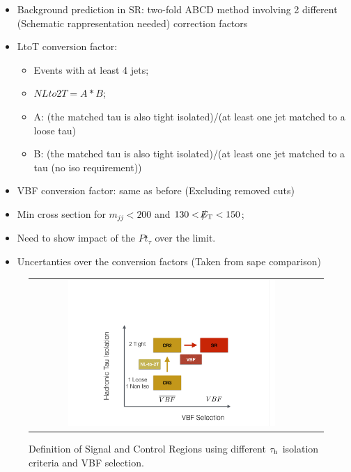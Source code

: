 \begin{itemize}
	
	\item Background prediction in SR: two-fold ABCD method involving 2 different (Schematic rappresentation needed) correction factors
	\item LtoT conversion factor:
	\begin{itemize}
		\item Events with at least 4 jets;
		\item $NLto2T = A * B$;
		\item A: (the matched tau is also tight isolated)/(at least one jet matched to a loose tau)
		\item B: (the matched tau is also tight isolated)/(at least one jet matched to a tau (no iso requirement))
	\end{itemize}
		\item VBF conversion factor: same as before (Excluding removed cuts)
		\item Min cross section for $m_{jj} < 200$ and $130 < \slash\mkern-12mu{E}_{\text{T}} < 150$;
		\item Need to show impact of the $Pt_{\tau}$ over the limit.
		\item Uncertanties over the conversion factors (Taken from sape comparison)
\end{itemize}

\begin{figure}[tbh!]
	\centering
	\begin{tabular}{cc}
		\includegraphics[width=0.75\textwidth]{PLOTS/diTauHadLSotherPlots/controlregions13TeV.pdf}
	\end{tabular}
	\caption{Definition of Signal and Control Regions using different $\tau_{\text{h}}$ isolation criteria and VBF selection.}
	\label{fig:crs_13tev}
\end{figure}